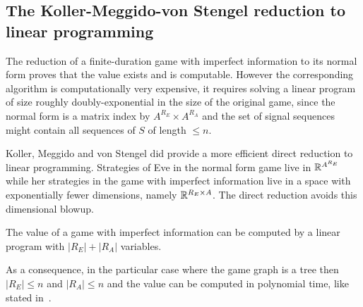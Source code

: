 \subsection{ The Koller-Meggido-von Stengel reduction to linear programming}




The reduction of a finite-duration game with imperfect information
to its normal form proves that the value exists and
is computable.
However the corresponding algorithm is computationally
very expensive, it requires solving
a linear program of size roughly doubly-exponential in the size 
of the original game, since the normal form is a matrix
index by $A^{R_E} \times A^{R_A}$ and the set of signal sequences
might contain all sequences of $S$ of length $\leq n$.

Koller, Meggido and von Stengel did provide a
more efficient direct reduction to linear programming.
Strategies of Eve in the normal form game live
in $\mathbb{R}^{A^{R_E}}$
while her strategies in the game with imperfect information
live in a space
with exponentially fewer dimensions, namely
$\mathbb{R}^{R_E\times A}$.
The direct reduction avoids this dimensional blowup.


\begin{theorem}
The value of a game with imperfect information
can be computed by a linear program with
$|R_E| + |R_A|$ variables.
\end{theorem}

As a consequence, in the particular case where the game graph is a tree
then $|R_E|\leq n$ and $|R_A|\leq n$
and the value can be computed in polynomial time,
like stated in~\cite{stengel}.

